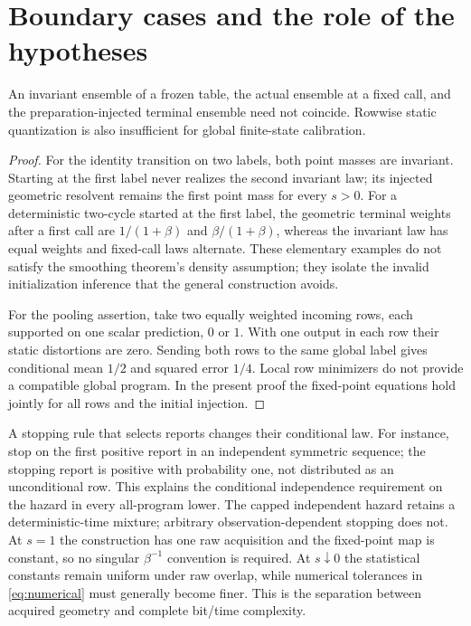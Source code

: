 \section{Boundary cases and the role of the hypotheses}\label{app:boundaries}
\begin{proposition}\label{prop:boundaries}
An invariant ensemble of a frozen table, the actual ensemble at a fixed call, and the preparation-injected terminal ensemble need not coincide. Rowwise static quantization is also insufficient for global finite-state calibration.
\end{proposition}
\begin{proof}
For the identity transition on two labels, both point masses are invariant. Starting at the first label never realizes the second invariant law; its injected geometric resolvent remains the first point mass for every $s>0$. For a deterministic two-cycle started at the first label, the geometric terminal weights after a first call are $1/(1+\beta)$ and $\beta/(1+\beta)$, whereas the invariant law has equal weights and fixed-call laws alternate. These elementary examples do not satisfy the smoothing theorem's density assumption; they isolate the invalid initialization inference that the general construction avoids.

For the pooling assertion, take two equally weighted incoming rows, each supported on one scalar prediction, $0$ or $1$. With one output in each row their static distortions are zero. Sending both rows to the same global label gives conditional mean $1/2$ and squared error $1/4$. Local row minimizers do not provide a compatible global program. In the present proof the fixed-point equations hold jointly for all rows and the initial injection.
\end{proof}

A stopping rule that selects reports changes their conditional law. For instance, stop on the first positive report in an independent symmetric sequence; the stopping report is positive with probability one, not distributed as an unconditional row. This explains the conditional independence requirement on the hazard in every all-program lower. The capped independent hazard retains a deterministic-time mixture; arbitrary observation-dependent stopping does not. At $s=1$ the construction has one raw acquisition and the fixed-point map is constant, so no singular $\beta^{-1}$ convention is required. At $s\downarrow0$ the statistical constants remain uniform under raw overlap, while numerical tolerances in \eqref{eq:numerical} must generally become finer. This is the separation between acquired geometry and complete bit/time complexity.


